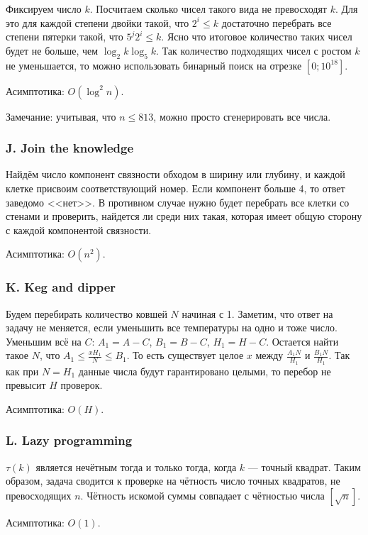 
Фиксируем число $k$. Посчитаем сколько чисел такого вида не превосходят $k$. Для это для каждой степени двойки такой, что $2^i \leqslant k$ достаточно перебрать все степени пятерки такой, что $5^j 2^i \leqslant k$. Ясно что итоговое количество таких чисел будет не больше, чем $\log_2{k} \log_5{k}$. Так количество подходящих чисел с ростом $k$ не уменьшается, то можно использовать бинарный поиск на отрезке $[0; 10^{18}]$.

Асимптотика: $O(\log^2{n})$.

Замечание: учитывая, что $n \leqslant 813$, можно просто сгенерировать все числа.



\subsubsection*{J. Join the knowledge} 


Найдём число компонент связности обходом в ширину или глубину, и каждой клетке присвоим соответствующий номер. Если компонент больше 4, то ответ заведомо <<нет>>. В противном случае нужно будет перебрать все клетки со стенами и проверить, найдется ли среди них такая, которая имеет общую сторону с каждой компонентой связности.

Асимптотика: $O(n^2)$.



\subsubsection*{K. Keg and dipper} 


Будем перебирать количество ковшей $N$ начиная с 1. Заметим, что ответ на задачу не меняется, если уменьшить все температуры на одно и тоже число. Уменьшим всё на $C$: $A_1 = A - C$, $B_1 = B - C$, $H_1 = H - C$. Остается найти такое $N$, что $A_1 \leqslant \frac{x H_1}{N} \leqslant B_1$. То есть существует целое $x$ между $\frac{A_1 N}{H_1}$ и $\frac{B_1 N}{H_1}$. Так как при $N = H_1$ данные числа будут гарантировано целыми, то перебор не превысит $H$ проверок.

Асимптотика: $O(H)$.



\subsubsection*{L. Lazy programming} 


$\tau(k)$ является нечётным тогда и только тогда, когда $k$ --- точный квадрат. Таким образом, задача сводится к проверке на чётность число точных квадратов, не превосходящих $n$. Чётность искомой
суммы совпадает с чётностью числа $[\sqrt{n}]$.

Асимптотика: $O(1)$.